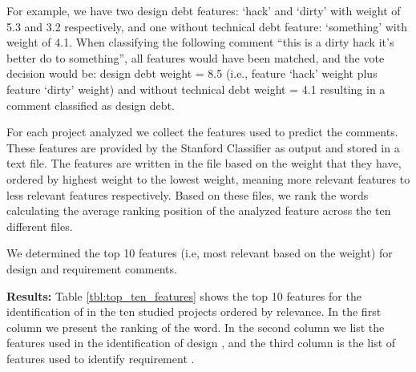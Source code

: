 For example, we have two design debt features: `hack' and `dirty' with weight of 5.3 and 3.2 respectively, and one without technical debt feature: `something' with weight of 4.1. When classifying the following comment ``this is a dirty hack it's better do to something'', all features would have been matched, and the vote decision would be: design debt weight = 8.5 (i.e., feature `hack' weight plus feature `dirty' weight) and without technical debt weight = 4.1 resulting in a comment classified as design debt.

For each project analyzed we collect the features used to predict the \SATD comments. These features are provided by the Stanford Classifier as output and stored in a text file. The features are written in the file based on the weight that they have, ordered by highest weight to the lowest weight, meaning more relevant features to less relevant features respectively. Based on these files, we rank the words calculating the average ranking position of the analyzed feature across the ten different files. 

We determined the top 10 features (i.e, most relevant based on the weight) for design and requirement \SATD comments.

\vspace{1mm}
\noindent \textbf{Results:} Table \ref{tbl:top_ten_features} shows the top 10 features for the identification of \SATD in the ten studied projects ordered by relevance. In the first column we present the ranking of the word. In the second column we list the features used in the identification of design \SATD, and the third column is the list of features used to identify requirement \SATD.

